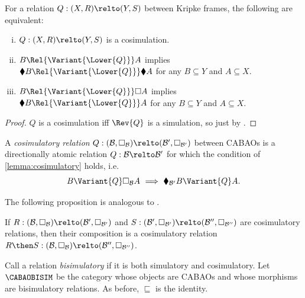 \begin{lemma}\label{lemma:cosim-black}\label{lemma:cosimulatory}
  For a relation \(Q : (X, R) \relto (Y, S)\) between Kripke frames,
  the following are equivalent:
  \begin{enumerate}[(i)]
  \item \(Q : (X, R) \relto (Y, S)\) is a cosimulation.
  \item \(B \Rel{\Variant{\Lower{Q}}} A\) implies
    \(\blacklozenge B \Rel{\Variant{\Lower{Q}}} \blacklozenge A\) for
    any \(B \subseteq Y\) and \(A \subseteq X\).
  \item \(B \Rel{\Variant{\Lower{Q}}} \Box A\) implies
    \(\blacklozenge B \Rel{\Variant{\Lower{Q}}} A\) for any
    \(B \subseteq Y\) and \(A \subseteq X\).
  \end{enumerate}
\end{lemma}
\begin{proof}
  \(Q\) is a cosimulation iff \(\Rev{Q}\) is a simulation, so just by
  .
\end{proof}

\begin{definition}
  A \emph{cosimulatory relation}
  \(Q : (\mathcal{B}, \Box_\mathcal{B}) \relto (\mathcal{B}',
  \Box_{\mathcal{B}'})\) between CABAOs is a directionally atomic
  relation \(Q : \mathcal{B} \relto \mathcal{B}'\) for which the
  condition of \cref{lemma:cosimulatory} holds, i.e.\
  \[
    B \Variant{Q} \Box_\mathcal{B} A\
    \Longrightarrow\
    \blacklozenge_{\mathcal{B}'} B \Variant{Q} A.
  \]
\end{definition}

The following proposition is analogous to
.

\begin{proposition}
  \label{proposition:cosimulatory-compose}
  If
  \(R : (\mathcal{B}, \Box_\mathcal{B}) \relto (\mathcal{B}',
  \Box_{\mathcal{B}'})\) and
  \(S : (\mathcal{B}', \Box_{\mathcal{B}'}) \relto (\mathcal{B}'',
  \Box_{\mathcal{B}''})\) are cosimulatory relations, then their composition
  is a cosimulatory relation
  \(R \then S : (\mathcal{B}, \Box_\mathcal{B}) \relto (\mathcal{B}'',
  \Box_{\mathcal{B}''})\).
\end{proposition}

Call a relation \emph{bisimulatory} if it is both simulatory and
cosimulatory. Let \(\CABAOBISIM\) be the category whose objects are
CABAOs and whose morphisms are bisimulatory relations. As before,
\(\sqsubseteq\) is the identity.

